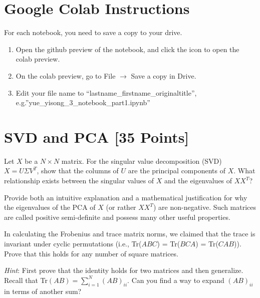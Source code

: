\section*{Google Colab Instructions}

For each notebook, you need to save a copy to your drive.

\begin{enumerate}
	\item Open the github preview of the notebook, and click the icon to open the colab preview.
	\item On the colab preview, go to File $\rightarrow$ Save a copy in Drive.
	\item Edit your file name to “lastname_firstname_originaltitle”, e.g.”yue_yisong_3_notebook_part1.ipynb”
\end{enumerate}


\newpage
\section{SVD and PCA [35 Points]}

\problem[3] Let $X$ be a $N \times N$ matrix. For the singular value decomposition (SVD) $X = U \Sigma V^T$, show that the columns of $U$ are the principal components of $X$. What relationship exists between the singular values of $X$ and the eigenvalues of $XX^T$?

\begin{solution}
\end{solution}

\problem[4] Provide both an intuitive explanation and a mathematical justification for why the eigenvalues of the PCA of $X$ (or rather $XX^T$) are non-negative. Such matrices are called positive semi-definite and possess many other useful properties.

\begin{solution}
\end{solution}

\problem[5] In calculating the Frobenius and trace matrix norms, we claimed that the trace is invariant under cyclic permutations (i.e., Tr($ABC$) = Tr($BCA$) = Tr($CAB$)). Prove that this holds for any number of square matrices.

\textit{Hint}: First prove that the identity holds for two matrices and then generalize. Recall that Tr$(AB) = \sum_{i=1}^{N}(AB)_{ii}$. Can you find a way to expand $(AB)_{ii}$ in terms of another sum?

\begin{solution}
\end{solution}

